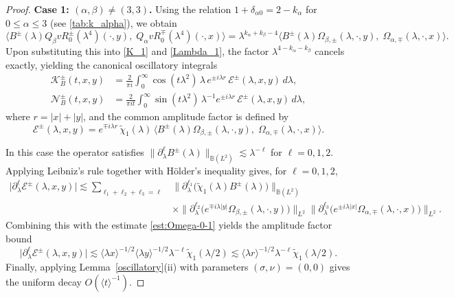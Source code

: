 \documentclass[reqno]{amsart}
\numberwithin{equation}{section}
\begin{document}
\begin{proof}
\textbf{Case 1: $(\alpha, \beta) \neq (3,3)$.}
Using the relation $1 + \delta_{\alpha 0} = 2 - k_\alpha$ for $0 \le \alpha \le 3$ (see \eqref{tab:k_alpha}), we obtain
\[
\bigl\langle B^\pm(\lambda) Q_\beta v R_0^{\pm}(\lambda^4)(\cdot, y),\; Q_\alpha v R_0^{\mp}(\lambda^4)(\cdot, x) \bigr\rangle
= \lambda^{k_\alpha+k_\beta-4} \bigl\langle B^\pm(\lambda) \Omega_{\beta,\pm}(\lambda, \cdot, y),\; \Omega_{\alpha,\mp}(\lambda, \cdot, x) \bigr\rangle.
\]
Upon substituting this  
into \eqref{K_1} and \eqref{Lambda_1}, the factor $\lambda^{4-k_\alpha-k_\beta}$ cancels exactly, yielding the canonical oscillatory integrals
\begin{equation}\label{rf}
	\begin{aligned}
		\mathcal{K}_{B}^\pm(t,x,y) &= \frac{2}{\pi i}\int_0^{\infty} \cos(t \lambda^2)\,\lambda\, e^{\pm i\lambda r}\, \mathcal{E}^\pm(\lambda, x,y) \, d\lambda, \\[4pt]
		\mathcal{N}_{B}^\pm(t,x,y) &= \frac{2}{\pi i t}\int_0^{\infty} \sin(t\lambda^2)\,\lambda^{-1} e^{\pm i\lambda r}\, \mathcal{E}^\pm(\lambda, x,y) \, d\lambda,
	\end{aligned}
\end{equation}
where $r = |x| + |y|$, and the common amplitude factor is defined by
\[
\mathcal{E}^\pm(\lambda, x,y) = e^{\mp i\lambda r}\,\widetilde{\chi}_1(\lambda)\,
\bigl\langle B^\pm(\lambda) \Omega_{\beta,\pm}(\lambda,\cdot,y),\; \Omega_{\alpha,\mp}(\lambda,\cdot,x) \bigr\rangle.
\]

In this case the operator satisfies $\|\partial_\lambda^{\ell} B^\pm(\lambda)\|_{\mathbb{B}(L^2)} \lesssim \lambda^{-\ell}$ for $\ell = 0,1,2$. 
Applying Leibniz's rule together with H\"older's inequality gives, for $\ell = 0,1,2$,
\[
\begin{aligned}
	\bigl|\partial_\lambda^{\ell} \mathcal{E}^\pm(\lambda, x,y) \bigr|
	\lesssim \sum_{\ell_1+\ell_2+\ell_3 =\ell}
	&\bigl\|\partial_\lambda^{\ell_1}\bigl(\widetilde{\chi}_1(\lambda) B^\pm (\lambda)\bigr) \bigr\|_{\mathbb{B}(L^2)} \\
	&\times \bigl\|\partial_\lambda^{\ell_2} \bigl(e^{\mp i \lambda|y|}\Omega_{\beta,\pm}(\lambda,\cdot,y)\bigr) \bigr\|_{L^2}
	\bigl\|\partial_\lambda^{\ell_3} \bigl(e^{\pm i \lambda |x|}\Omega_{\alpha,\mp}(\lambda,\cdot,x)\bigr) \bigr\|_{L^2}.
\end{aligned}
\]
Combining this with the estimate \eqref{est:Omega-0-1} yields the amplitude factor bound
\[
\bigl|\partial_\lambda^{\ell} \mathcal{E}^\pm(\lambda, x,y) \bigr|
\lesssim \langle \lambda x\rangle^{-1/2} \langle \lambda y\rangle^{-1/2} \lambda^{-\ell} \widetilde{\chi}_1(\lambda/2)
\lesssim \langle \lambda r \rangle^{-1/2} \lambda^{-\ell} \widetilde{\chi}_1(\lambda/2).
\]
Finally, applying Lemma~\ref{oscillatory}(ii) with parameters $(\sigma, \nu) = (0,0)$ gives the uniform decay $O(\langle t\rangle^{-1})$.





\end{proof}
\end{document}
